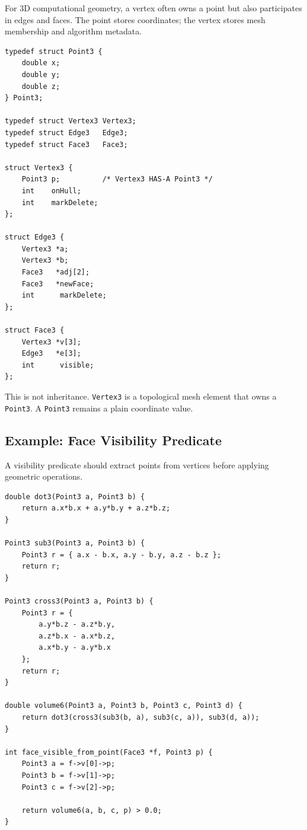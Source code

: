 \documentclass[11pt]{article}
\begin{document}
For 3D computational geometry, a vertex often owns a point but also participates in edges and faces. The point stores coordinates; the vertex stores mesh membership and algorithm metadata.

\begin{verbatim}
typedef struct Point3 {
    double x;
    double y;
    double z;
} Point3;

typedef struct Vertex3 Vertex3;
typedef struct Edge3   Edge3;
typedef struct Face3   Face3;

struct Vertex3 {
    Point3 p;          /* Vertex3 HAS-A Point3 */
    int    onHull;
    int    markDelete;
};

struct Edge3 {
    Vertex3 *a;
    Vertex3 *b;
    Face3   *adj[2];
    Face3   *newFace;
    int      markDelete;
};

struct Face3 {
    Vertex3 *v[3];
    Edge3   *e[3];
    int      visible;
};
\end{verbatim}

This is not inheritance. \texttt{Vertex3} is a topological mesh element that owns a \texttt{Point3}. A \texttt{Point3} remains a plain coordinate value.

\subsection{Example: Face Visibility Predicate}

A visibility predicate should extract points from vertices before applying geometric operations.

\begin{verbatim}
double dot3(Point3 a, Point3 b) {
    return a.x*b.x + a.y*b.y + a.z*b.z;
}

Point3 sub3(Point3 a, Point3 b) {
    Point3 r = { a.x - b.x, a.y - b.y, a.z - b.z };
    return r;
}

Point3 cross3(Point3 a, Point3 b) {
    Point3 r = {
        a.y*b.z - a.z*b.y,
        a.z*b.x - a.x*b.z,
        a.x*b.y - a.y*b.x
    };
    return r;
}

double volume6(Point3 a, Point3 b, Point3 c, Point3 d) {
    return dot3(cross3(sub3(b, a), sub3(c, a)), sub3(d, a));
}

int face_visible_from_point(Face3 *f, Point3 p) {
    Point3 a = f->v[0]->p;
    Point3 b = f->v[1]->p;
    Point3 c = f->v[2]->p;

    return volume6(a, b, c, p) > 0.0;
}
\end{verbatim}
\end{document}
